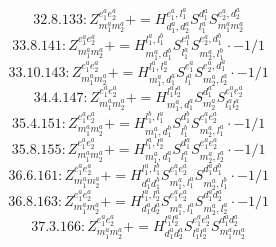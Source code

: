 \documentclass[letterpaper,10pt,fleqn,leqno,onecolumn]{article}
\begin{document}
\begin{equation} \;\;\;\;\;\;  32.8.133: Z^{e_{1}^{a}e_{2}^{a}}_{m_{1}^{a}m_{2}^{a}}+=H^{e_{1}^{a},l_{1}^{a}}_{d_{1}^{a},d_{2}^{a}}S^{d_{1}^{a}}_{l_{1}^{a}}S^{e_{2}^{a},d_{2}^{a}}_{m_{1}^{a}m_{2}^{a}} \end{equation}
\begin{equation} \;\;\;\;\;\;  33.8.141: Z^{e_{1}^{a}e_{2}^{a}}_{m_{1}^{a}m_{2}^{a}}+=H^{l_{1}^{a},l_{1}^{b}}_{m_{1}^{a},d_{1}^{b}}S^{e_{1}^{a}}_{l_{1}^{a}}S^{e_{2}^{a},d_{1}^{b}}_{m_{2}^{a},l_{1}^{b}}\cdot -1/1 \end{equation}
\begin{equation} \;\;\;\;\;\;  33.10.143: Z^{e_{1}^{a}e_{2}^{a}}_{m_{1}^{a}m_{2}^{a}}+=H^{l_{1}^{a},l_{2}^{a}}_{m_{1}^{a},d_{1}^{a}}S^{e_{1}^{a}}_{l_{1}^{a}}S^{e_{2}^{a},d_{1}^{a}}_{m_{2}^{a},l_{2}^{a}}\cdot -1/1 \end{equation}
\begin{equation} \;\;\;\;\;\;  34.4.147: Z^{e_{1}^{a}e_{2}^{a}}_{m_{1}^{a}m_{2}^{a}}+=H^{l_{1}^{a}l_{2}^{a}}_{m_{1}^{a},d_{1}^{a}}S^{d_{1}^{a}}_{m_{2}^{a}}S^{e_{1}^{a}e_{2}^{a}}_{l_{1}^{a}l_{2}^{a}} \end{equation}
\begin{equation} \;\;\;\;\;\;  35.4.151: Z^{e_{1}^{a}e_{2}^{a}}_{m_{1}^{a}m_{2}^{a}}+=H^{l_{1}^{b},l_{1}^{a}}_{m_{1}^{a},d_{1}^{b}}S^{d_{1}^{b}}_{l_{1}^{b}}S^{e_{1}^{a}e_{2}^{a}}_{m_{2}^{a},l_{1}^{a}}\cdot -1/1 \end{equation}
\begin{equation} \;\;\;\;\;\;  35.8.155: Z^{e_{1}^{a}e_{2}^{a}}_{m_{1}^{a}m_{2}^{a}}+=H^{l_{1}^{a},l_{2}^{a}}_{m_{1}^{a},d_{1}^{a}}S^{d_{1}^{a}}_{l_{1}^{a}}S^{e_{1}^{a}e_{2}^{a}}_{m_{2}^{a},l_{2}^{a}}\cdot -1/1 \end{equation}
\begin{equation} \;\;\;\;\;\;  36.6.161: Z^{e_{1}^{a}e_{2}^{a}}_{m_{1}^{a}m_{2}^{a}}+=H^{l_{1}^{a},l_{1}^{b}}_{d_{1}^{a}d_{1}^{b}}S^{e_{1}^{a}e_{2}^{a}}_{m_{1}^{a},l_{1}^{a}}S^{d_{1}^{a}d_{1}^{b}}_{m_{2}^{a},l_{1}^{b}}\cdot -1/1 \end{equation}
\begin{equation} \;\;\;\;\;\;  36.8.163: Z^{e_{1}^{a}e_{2}^{a}}_{m_{1}^{a}m_{2}^{a}}+=H^{l_{1}^{a},l_{2}^{a}}_{d_{1}^{a}d_{2}^{a}}S^{e_{1}^{a}e_{2}^{a}}_{m_{1}^{a},l_{1}^{a}}S^{d_{1}^{a}d_{2}^{a}}_{m_{2}^{a},l_{2}^{a}}\cdot -1/1 \end{equation}
\begin{equation} \;\;\;\;\;\;  37.3.166: Z^{e_{1}^{a}e_{2}^{a}}_{m_{1}^{a}m_{2}^{a}}+=H^{l_{1}^{a}l_{2}^{a}}_{d_{1}^{a}d_{2}^{a}}S^{e_{1}^{a}e_{2}^{a}}_{l_{1}^{a}l_{2}^{a}}S^{d_{1}^{a}d_{2}^{a}}_{m_{1}^{a}m_{2}^{a}} \end{equation}
\end{document}
